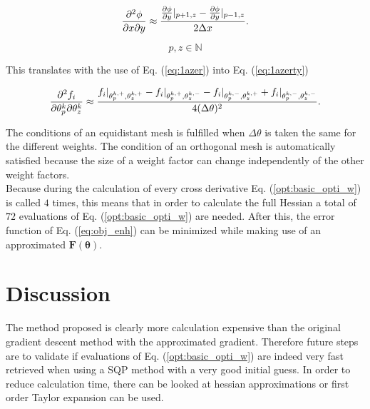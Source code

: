 \begin{equation}\label{eq:book}
	\pdv{\phi}{x}{y} \approx \frac{\pdv{\phi}{y}|_{p+1,z} - \pdv{\phi}{y}|_{p-1,z}}{2 \Delta x}.
\end{equation}

\[p,z \in \mathbb{N}\]

This translates with the use of Eq. (\ref{eq:1azer}) into Eq. (\ref{eq:1azerty}) 

\begin{equation}\label{eq:1azerty}
\pdv{f_i}{\theta^{k}_p}{\theta^{k}_z} \approx \frac{f_i|_{\theta^{k,+}_p,\theta^{k,+}_z} - f_i|_{\theta^{k,+}_p,\theta^{k,-}_z} - f_i|_{\theta^{k,-}_p,\theta^{k,+}_z}+f_i|_{\theta^{k,-}_p,\theta^{k,-}_z}}{4(\Delta \theta)^2}.
\end{equation}

The conditions of an equidistant mesh is fulfilled when $\Delta \theta$ is taken the same for the different weights. The condition of an orthogonal mesh is automatically satisfied because the size of a weight factor can change independently of the other weight factors.\\
Because during the calculation of every cross derivative Eq. (\ref{opt:basic_opti_w}) is called $4$ times, this means that in order to calculate the full Hessian a total of $72$ evaluations of Eq. (\ref{opt:basic_opti_w}) are needed. After this, the error function of Eq. (\ref{eq:obj_enh}) can be minimized while making use of an approximated $\bm{F(\bm{\theta})}$.


\section{Discussion} \label{s:discussion_enh}
The method proposed is clearly more calculation expensive than the original gradient descent method with the approximated gradient. Therefore future steps are to validate if evaluations of Eq. (\ref{opt:basic_opti_w}) are indeed very fast retrieved when using a SQP method with a very good initial guess. In order to reduce calculation time, there can be looked at hessian approximations or first order Taylor expansion can be used. 


